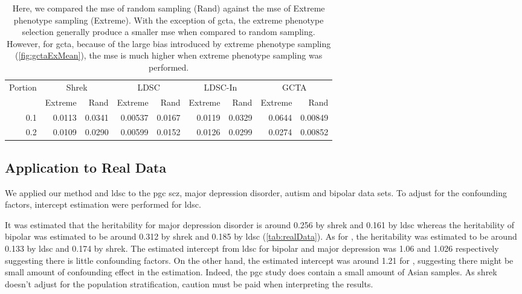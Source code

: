 		
		\begin{table}
			\centering
			\begin{tabular}{rrrrrrrrr}
				\toprule
				\multirow{2}[4]{*}{Portion} & \multicolumn{2}{c}{Shrek} & \multicolumn{2}{c}{LDSC} & \multicolumn{2}{c}{LDSC-In} & \multicolumn{2}{c}{GCTA} \\
				& Extreme & Rand & Extreme & Rand & Extreme & Rand & Extreme & Rand\\
				\midrule
				0.1   & 0.0113 & 0.0341 & 0.00537 & 0.0167 & 0.0119 & 0.0329 & 0.0644 & 0.00849 \\
				0.2   & 0.0109 & 0.0290 & 0.00599 & 0.0152 & 0.0126 & 0.0299 & 0.0274 & 0.00852 \\
				\bottomrule
			\end{tabular}
			\caption[Comparing the MSE of Extreme Phenotype Sampling and Random Sampling]{
				Here, we compared the \gls{mse} of random sampling (Rand) against the \gls{mse} of Extreme phenotype sampling (Extreme). 
				With the exception of \gls{gcta}, the extreme phenotype selection generally produce a smaller \gls{mse} when compared to random sampling. 
				However, for \gls{gcta}, because of the large bias introduced by extreme phenotype sampling (\cref{fig:gctaExMean}), the \gls{mse} is much higher when extreme phenotype sampling was performed.
			}
			\label{tab:ratioEx}
		\end{table}
		
		
		\subsection{Application to Real Data}
		We applied our method and \gls{ldsc} to the \gls{pgc} \gls{scz}, major depression disorder, autism and bipolar data sets.
		To adjust for the confounding factors, intercept estimation were performed for \gls{ldsc}. 
		
		It was estimated that the heritability for major depression disorder is around 0.256 by \gls{shrek} and 0.161 by \gls{ldsc} whereas the heritability of bipolar was estimated to be around 0.312 by \gls{shrek} and 0.185 by \gls{ldsc} (\cref{tab:realData}).
		As for , the heritability was estimated to be around 0.133 by \gls{ldsc} and 0.174 by \gls{shrek}.
		The estimated intercept from \gls{ldsc} for bipolar and major depression was 1.06 and 1.026 respectively suggesting there is little confounding factors. 
		On the other hand, the estimated intercept was around 1.21 for , suggesting there might be small amount of confounding effect in the estimation.
		Indeed, the \gls{pgc}  study \citep{Ripke2014} does contain a small amount of Asian samples.
		As \gls{shrek} doesn't adjust for the population stratification, caution must be paid when interpreting the results.
		
